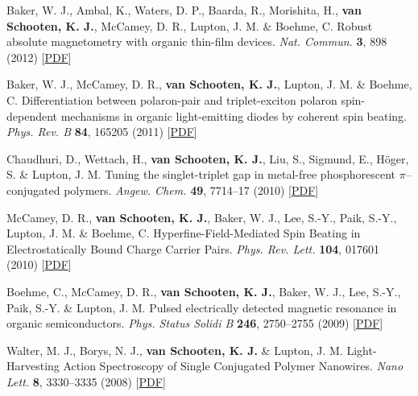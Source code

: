 \documentclass[11pt,letterpaper]{article}
\begin{document}
\begin{bibenum}
		\item Baker, W. J., Ambal, K., Waters, D. P., Baarda, R., Morishita, H., \textbf{van Schooten, K. J.}, McCamey,
D. R., Lupton, J. M. \& Boehme, C. Robust absolute magnetometry with organic thin-film devices. \textit{Nat. Commun.} \textbf{3}, 898 (2012)  [\href{http://www.physics.utah.edu/~kippvs/papers/2012_NatComm.pdf}{PDF}]

		\item Baker, W. J., McCamey, D. R., \textbf{van Schooten, K. J.}, Lupton, J. M. \& Boehme, C. Differentiation between polaron-pair and triplet-exciton polaron spin-dependent mechanisms in organic light-emitting diodes by coherent spin beating. \textit{Phys. Rev. B} \textbf{84}, 165205 (2011)  [\href{http://www.physics.utah.edu/~kippvs/papers/2011_PRB.pdf}{PDF}]
		
		\item Chaudhuri, D., Wettach, H., \textbf{van Schooten, K. J.}, Liu, S., Sigmund, E., H\"{o}ger, S. \& Lupton, J. M. Tuning the singlet-triplet gap in metal-free phosphorescent $\pi$--conjugated polymers. \textit{Angew. Chem.} \textbf{49}, 7714--17 (2010)  [\href{http://www.physics.utah.edu/~kippvs/papers/2010_Angew.pdf}{PDF}]
		
		\item McCamey, D. R., \textbf{van Schooten, K. J.}, Baker, W. J., Lee, S.-Y., Paik, S.-Y., Lupton, J. M. \& Boehme, C. Hyperfine-Field-Mediated Spin Beating in Electrostatically Bound Charge Carrier Pairs. \textit{Phys. Rev. Lett.} \textbf{104}, 017601 (2010)  [\href{http://www.physics.utah.edu/~kippvs/papers/2010_PRL.pdf}{PDF}]
		
		\item Boehme, C., McCamey, D. R., \textbf{van Schooten, K. J.}, Baker, W. J., Lee, S.-Y., Paik, S.-Y. \& Lupton, J. M. Pulsed electrically detected magnetic resonance in organic semiconductors. \textit{Phys. Status Solidi B} \textbf{246}, 2750--2755 (2009)  [\href{http://www.physics.utah.edu/~kippvs/papers/2009_PSSb.pdf}{PDF}]
		
		\item Walter, M. J., Borys, N. J., \textbf{van Schooten, K. J.} \& Lupton, J. M. Light-Harvesting Action Spectroscopy of Single Conjugated Polymer Nanowires. \textit{Nano Lett.} \textbf{8}, 3330--3335 (2008)  [\href{http://www.physics.utah.edu/~kippvs/papers/2008_NanoLett.pdf}{PDF}]

\end{bibenum}
\end{document}
